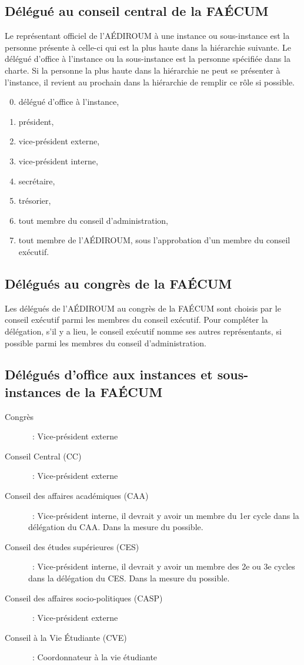 \documentclass{aediroum}
\begin{document}
\subsection{Délégué au conseil central de la FAÉCUM}\label{sec:delegue-conseil-central}

Le représentant officiel de l'AÉDIROUM à une instance ou sous-instance est la personne présente à celle-ci qui est la plus haute dans la hiérarchie suivante. Le délégué d'office à l'instance ou la sous-instance est la personne spécifiée dans la charte. Si la personne la plus haute dans la hiérarchie ne peut se présenter à l'instance, il revient au prochain dans la hiérarchie de remplir ce rôle si possible.
  \begin{enumerate}\setcounter{enumi}{-1}
  \item délégué d'office à l'instance,
  \item président,
  \item vice-président externe,
  \item vice-président interne,
  \item secrétaire,
  \item trésorier,
  \item tout membre du conseil d'administration,
  \item tout membre de l'AÉDIROUM, sous l'approbation d'un membre du conseil exécutif.
  \end{enumerate}

\subsection{Délégués au congrès de la FAÉCUM}\label{sec:delegues-congres}
Les délégués de l'AÉDIROUM au congrès de la FAÉCUM sont choisis par le conseil exécutif parmi les membres du conseil exécutif. Pour compléter la délégation, s'il y a lieu, le conseil exécutif nomme ses autres représentants, si possible parmi les membres du conseil d'administration.

\subsection{Délégués d'office aux instances et sous-instances de la FAÉCUM}\label{sec:delegues-doffice-instances}
\begin{description}
\item[Congrès]~: Vice-président externe
\item[Conseil Central (CC)]~: Vice-président externe
\item[Conseil des affaires académiques (CAA)]~: Vice-président interne, il devrait y avoir un membre du 1er cycle dans la délégation du CAA. Dans la mesure du possible.
\item[Conseil des études supérieures (CES)]~: Vice-président interne, il devrait y avoir un membre des 2e ou 3e cycles dans la délégation du CES. Dans la mesure du possible.
\item[Conseil des affaires socio-politiques (CASP)]~: Vice-président externe
\item[Conseil à la Vie Étudiante (CVE)]~: Coordonnateur à la vie étudiante
\end{description}
\end{document}
